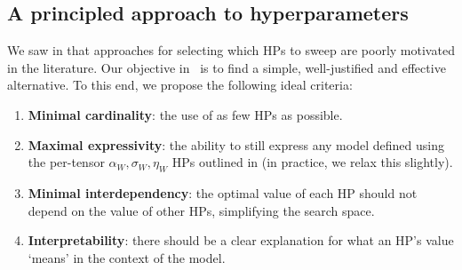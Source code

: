 
\subsection{A principled approach to hyperparameters} \label{sec:umup:principled_hps}

We saw in  that approaches for selecting which HPs to sweep are poorly motivated in the literature. Our objective in \umup\ is to find a simple, well-justified and effective alternative. To this end, we propose the following ideal criteria:

\begin{enumerate}
    \item \textbf{Minimal cardinality}: the use of as few HPs as possible.
    \item \textbf{Maximal expressivity}: the ability to still express any model defined using the per-tensor $\alpha_W, \sigma_W, \eta_W$ HPs outlined in  (in practice, we relax this slightly).
    \item \textbf{Minimal interdependency}: the optimal value of each HP should not depend on the value of other HPs, simplifying the search space.
    \item \textbf{Interpretability}: there should be a clear explanation for what an HP's value `means' in the context of the model.
\end{enumerate}

